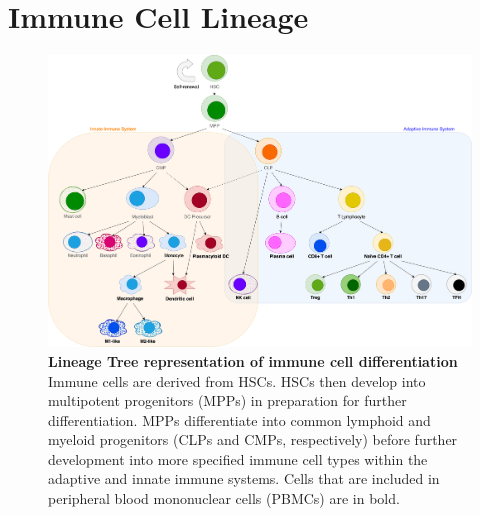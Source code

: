 
\section{Immune Cell Lineage}

\begin{figure}
    \centering
    \includegraphics[width=\textwidth]{Figures/immunediff.png}
    \caption{\textbf{Lineage Tree representation of immune cell differentiation} Immune cells are derived from HSCs. HSCs then develop into multipotent progenitors (MPPs) in preparation for further differentiation. MPPs differentiate into common lymphoid and myeloid progenitors (CLPs and CMPs, respectively) before further development into more specified immune cell types within the adaptive and innate immune systems. Cells that are included in peripheral blood mononuclear cells (PBMCs) are in bold.}
    \label{fig:immune-cells}
\end{figure}

